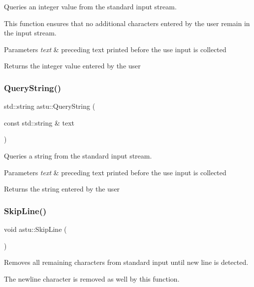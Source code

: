 Queries an integer value from the standard input stream.

This function ensures that no additional characters entered by the user remain in the input stream.


\begin{DoxyParams}{Parameters}
{\em text} & preceding text printed before the use input is collected \\
\hline
\end{DoxyParams}
\begin{DoxyReturn}{Returns}
the integer value entered by the user 
\end{DoxyReturn}
\mbox{\label{namespaceastu_ac80dcbf4d76b7e0f3b4e44617e005608}} 
\subsubsection{\texorpdfstring{Query\+String()}{QueryString()}}
{\footnotesize\ttfamily std\+::string astu\+::\+Query\+String (\begin{DoxyParamCaption}\item[{const std\+::string \&}]{text }\end{DoxyParamCaption})}

Queries a string from the standard input stream.


\begin{DoxyParams}{Parameters}
{\em text} & preceding text printed before the use input is collected \\
\hline
\end{DoxyParams}
\begin{DoxyReturn}{Returns}
the string entered by the user 
\end{DoxyReturn}
\mbox{\label{namespaceastu_a7cc89ae306750b9cfebac64bb5e9181c}} 
\subsubsection{\texorpdfstring{Skip\+Line()}{SkipLine()}}
{\footnotesize\ttfamily void astu\+::\+Skip\+Line (\begin{DoxyParamCaption}{ }\end{DoxyParamCaption})}

Removes all remaining characters from standard input until new line is detected.

The newline character is removed as well by this function. 